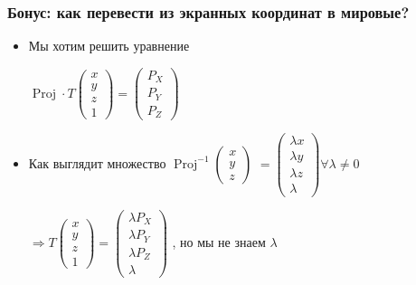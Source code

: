\documentclass[10pt]{beamer}
\begin{document}
\begin{frame}[fragile]
\frametitle{Бонус: как перевести из экранных координат в мировые?}
\begin{itemize}
\item Мы хотим решить уравнение
\begin{center}
\begin{math}
\operatorname{Proj}\cdot T \begin{pmatrix}x \\ y \\ z \\ 1\end{pmatrix} = \begin{pmatrix}P_X \\ P_Y \\ P_Z\end{pmatrix}
\end{math}
\end{center}
\pause
\item Как выглядит множество \begin{math}\operatorname{Proj}^{-1} \begin{pmatrix}x \\ y \\ z\end{pmatrix}\end{math} \pause \begin{math}=\begin{pmatrix}\lambda x \\ \lambda y \\ \lambda z \\ \lambda \end{pmatrix} \forall \lambda  \neq 0\end{math}
\pause
\begin{center}
\begin{math}
\Rightarrow T \begin{pmatrix}x \\ y \\ z \\ 1\end{pmatrix} = \begin{pmatrix}\lambda P_X \\ \lambda P_Y \\ \lambda P_Z \\ \lambda\end{pmatrix}
\end{math}
, но мы не знаем \begin{math}\lambda\end{math}
\end{center}
\end{itemize}
\end{frame}
\end{document}
